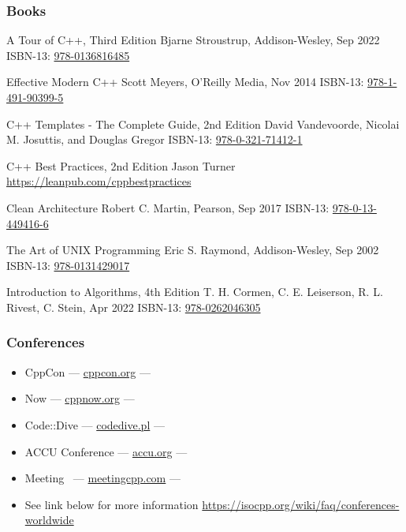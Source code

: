 \documentclass[compress]{beamer}
\begin{document}
\begin{frame}
  \frametitle{Books}
  \begin{thebibliography}{10}
    \scriptsize
    \beamertemplatebookbibitems

    \bibitem{} A Tour of C++, Third Edition
    \newblock  Bjarne Stroustrup, Addison-Wesley, Sep 2022
    \newblock  ISBN-13: \href{https://learning.oreilly.com/library/view/a-tour-of/9780136823575/}{978-0136816485}

    \bibitem{} Effective Modern C++
    \newblock  Scott Meyers, O'Reilly Media, Nov 2014
    \newblock  ISBN-13: \href{https://learning.oreilly.com/library/view/effective-modern-c/9781491908419/}{978-1-491-90399-5}

    \bibitem{} C++ Templates - The Complete Guide, 2nd Edition
    \newblock  David Vandevoorde, Nicolai M. Josuttis, and Douglas Gregor
    \newblock  ISBN-13: \href{https://learning.oreilly.com/library/view/c-templates-the/9780134778808/}{978-0-321-71412-1}

    \bibitem{} C++ Best Practices, 2nd Edition
    \newblock  Jason Turner
    \newblock  \url{https://leanpub.com/cppbestpractices}

    \bibitem{} Clean Architecture
    \newblock  Robert C. Martin, Pearson, Sep 2017
    \newblock  ISBN-13: \href{https://learning.oreilly.com/library/view/clean-architecture-a/9780134494272/}{978-0-13-449416-6}

    \bibitem{} The Art of UNIX Programming
    \newblock  Eric S. Raymond, Addison-Wesley, Sep 2002
    \newblock  ISBN-13: \href{https://learning.oreilly.com/library/view/the-art-of/0131429019/}{978-0131429017}

    \bibitem{} Introduction to Algorithms, 4th Edition
    \newblock  T. H. Cormen, C. E. Leiserson, R. L. Rivest, C. Stein, Apr 2022
    \newblock  ISBN-13: \href{https://mitpress.mit.edu/9780262046305/introduction-to-algorithms/}{978-0262046305}
  \end{thebibliography}
\end{frame}

\begin{frame}
  \frametitle{Conferences}
  \begin{itemize}
    \item CppCon --- \href{https://cppcon.org/}{cppcon.org} --- 
    \item \cpp Now --- \href{https://cppnow.org/}{cppnow.org} --- 
    \item Code::Dive --- \href{https://codedive.pl/}{codedive.pl} --- 
    \item ACCU Conference --- \href{https://accu.org/}{accu.org}  --- 
    \item Meeting \cpp\ --- \href{https://meetingcpp.com/}{meetingcpp.com} --- 
    \item See link below for more information
          \url{https://isocpp.org/wiki/faq/conferences-worldwide}
  \end{itemize}
\end{frame}
\end{document}
